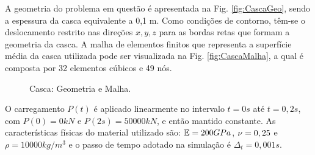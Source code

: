 \documentclass[tese_patricia]{subfiles}
\begin{document}
A geometria do problema em questão é apresentada na Fig. \ref{fig:CascaGeo}, sendo a espessura da casca equivalente a 0,1 m. Como condições de contorno, têm-se o deslocamento restrito nas direções $x,y,z$ para as bordas retas que formam a geometria da casca. A malha de elementos finitos que representa a superfície média da casca utilizada pode ser visualizada na Fig. \ref{fig:CascaMalha}, a qual é composta por 32 elementos cúbicos e 49 nós. 

\begin{figure}[!htb]
	\centering
	\caption{Casca: Geometria e Malha.}
	\label{fig:Casca}
\end{figure}

O carregamento $P(t)$ é aplicado linearmente no intervalo $t=0s$ até $t=0,2s$, com $P(0)=0kN$ e $P(2s) = 50000kN$, e então mantido constante. As características físicas do material utilizado são: $\mathbb{E} = 200GPa$, $\nu = 0,25$ e $\rho = 10000 kg/m^3$ e o passo de tempo adotado na simulação é $\Delta_{t} = 0,001s$.
\end{document}
